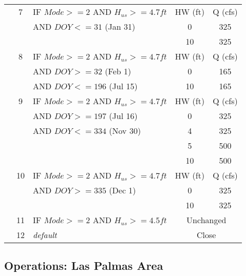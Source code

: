 \begin{table}[!h]
\begin{tabular}{|l|c|l|c|c|}
              &  7  & IF $Mode>=2$ AND $H_{us}>=4.7ft$             & HW (ft) & Q (cfs)  \\
              &     & AND $DOY<=31$ (Jan 31)                       & 0    &  325 \\
              &     &                                              & 10   &  325 \\
\hline
              &  8  & IF $Mode>=2$ AND $H_{us}>=4.7ft$             & HW (ft) & Q (cfs)  \\
              &     & AND $DOY>=32$ (Feb 1)                        & 0    &  165 \\
              &     & AND $DOY<=196$ (Jul 15)                      & 10   &  165 \\
\hline
              &  9  & IF $Mode>=2$ AND $H_{us}>=4.7ft$             & HW (ft) & Q (cfs)  \\
              &     & AND $DOY>=197$ (Jul 16)                      & 0    &  325 \\
              &     & AND $DOY<=334$ (Nov 30)                      & 4    &  325 \\
              &     &                                              & 5    &  500 \\
              &     &                                              & 10   &  500 \\
\hline
              &  10 & IF $Mode>=2$ AND $H_{us}>=4.7ft$             & HW (ft) & Q (cfs)  \\
              &     & AND $DOY>=335$ (Dec 1)                       & 0    &  325 \\
              &     &                                              & 10   &  325 \\
\hline
              &  11 & IF $Mode>=2$ AND $H_{us}>=4.5ft$             & \multicolumn{2}{|c|}{Unchanged}   \\
\hline


\hline
              &  12  & \it{default}                                 & \multicolumn{2}{|c|}{Close}           \\
\hline
\hline
\end{tabular}
\end{table}
\normalsize

\clearpage

\subsection{Operations: Las Palmas Area}

